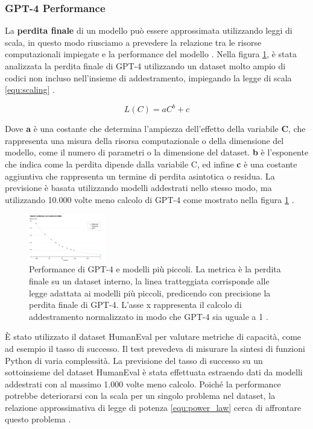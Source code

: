 \subsubsection{GPT-4 Performance}
La \textbf{perdita finale} di un modello può essere approssimata utilizzando leggi di scala, in questo modo riusciamo a prevedere la relazione tra le risorse computazionali impiegate e la performance del modello \cite{achiam2023gpt}.
Nella figura \ref{fig:loss-prediction}, è stata analizzata la perdita finale di GPT-4 utilizzando un dataset molto ampio di codici non incluso nell'insieme di addestramento, impiegando la legge di scala \ref{equ:scaling} \cite{henighan2020scaling}.

\begin{equation}
    L(C) = aC^b + c
    \label{equ:scaling}
\end{equation}

Dove \textbf{a} è una costante che determina l'ampiezza dell'effetto della variabile \textbf{C}, che rappresenta una misura della risorsa computazionale o della dimensione del modello, come il numero di parametri o la dimensione del dataset. \textbf{b} è l'esponente che indica come la perdita dipende dalla variabile C, ed infine \textbf{c} è una costante aggiuntiva che rappresenta un termine di perdita asintotica o residua.
La previsione è basata utilizzando modelli addestrati nello stesso modo, ma utilizzando 10.000 volte meno calcolo di GPT-4 come mostrato nella figura \ref{fig:loss-prediction} \cite{achiam2023gpt}.
\begin{figure}[ht]
	\centering
	\includegraphics[width=0.3\textwidth]{Immagini/GPT-4_word_prediction.png}
	\caption{ Performance di GPT-4 e modelli più piccoli. La metrica è la perdita finale su un dataset interno, la linea tratteggiata corrisponde alle legge adattata ai modelli più piccoli, predicendo con precisione la perdita finale di GPT-4. L'asse x rappresenta il calcolo di addestramento normalizzato in modo che GPT-4 sia uguale a 1 \cite{achiam2023gpt}.}
	\label{fig:loss-prediction}
\end{figure}

È stato utilizzato il dataset HumanEval \cite{chen2021evaluating} per valutare metriche di capacità, come ad esempio il tasso di successo. Il test prevedeva di misurare la sintesi di funzioni Python di varia complessità. La previsione del tasso di successo su un sottoinsieme del dataset HumanEval è stata effettuata estraendo dati da modelli addestrati con al massimo 1.000 volte meno calcolo. Poiché la performance potrebbe deteriorarsi con la scala per un singolo problema nel dataset, la relazione approssimativa di legge di potenza \ref{equ:power_law} cerca di affrontare questo problema \cite{achiam2023gpt}.

